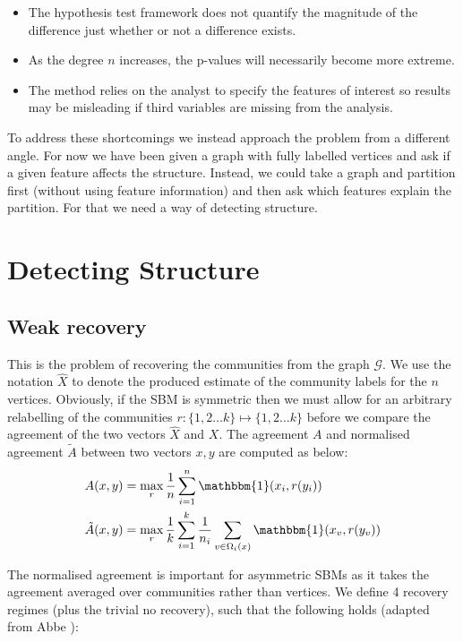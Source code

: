 \documentclass[]{article}
\newcommand{\Gcal}{\mathcal{G}}
\newcommand{\one}{\mathbbm{1}}
\begin{document}
\begin{multicols*}{2}
\begin{itemize}
	\item The hypothesis test framework does not quantify the magnitude of the difference just whether or not a difference exists.
	\item As the degree $n$ increases, the p-values will necessarily become more extreme.
	\item The method relies on the analyst to specify the features of interest so results may be misleading if third variables are missing from the analysis.
\end{itemize} 

To address these shortcomings we instead approach the problem from a different angle. For now we have been given a graph with fully labelled vertices and ask if a given feature affects the structure. Instead, we could take a graph and partition first (without using feature information) and then ask which features explain the partition. For that we need a way of detecting structure.

\section{Detecting Structure}
\subsection{Weak recovery}

This is the problem of recovering the communities from the graph $\Gcal$. We use the notation $\hat{X}$ to denote the produced estimate of the community labels for the $n$ vertices. Obviously, if the SBM is symmetric then we must allow for an arbitrary relabelling of the communities $r: \{1, 2 \dots k\} \mapsto \{1, 2 \dots k\}$ before we compare the agreement of the two vectors $\hat{X}$ and $X$. The agreement $A$ and normalised agreement $\tilde{A}$ between two vectors $x, y$ are computed as below:
%
\begin{align}
	A(x, y) &= \max_r \frac{1}{n} \sum_{i=1}^{n} \one (x_i, r(y_i)) \\
	\tilde{A}(x, y) &= \max_r \frac{1}{k} \sum_{i=1}^{k} \frac{1}{n_i} \sum_{v \in \Omega_i(x)} \one(x_v, r(y_v))
\end{align}

The normalised agreement is important for asymmetric SBMs as it takes the agreement averaged over communities rather than vertices. We define 4 recovery regimes (plus the trivial no recovery), such that the following holds (adapted from Abbe \cite{Abbe}):


\end{multicols*}
\end{document}
